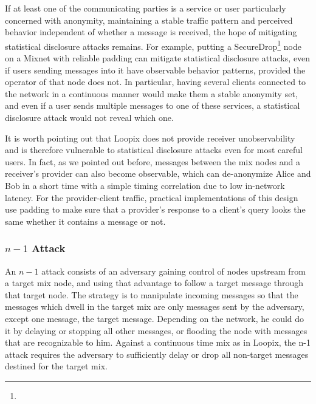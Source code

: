 \documentclass{article}
\begin{document}
If at least one of the communicating parties is a service or user particularly concerned with anonymity, maintaining a stable traffic pattern and perceived behavior independent of whether a message is received, the hope of mitigating statistical disclosure attacks remains. For example, putting a SecureDrop\footnote{} node on a Mixnet with reliable padding can mitigate statistical disclosure attacks, even if users sending messages into it have observable behavior patterns, provided the operator of that node does not. In particular, having several clients connected to the network in a continuous manner would make them a stable anonymity set, and even if a user sends multiple messages to one of these services, a statistical disclosure attack would not reveal which one.

It is worth pointing out that Loopix does not provide receiver unobservability and is therefore vulnerable to statistical disclosure attacks even for most careful users. In fact, as we pointed out before, messages between the mix nodes and a receiver's provider can also become observable, which can de-anonymize Alice and Bob in a short time with a simple timing correlation due to low in-network latency. For the provider-client traffic, practical implementations of this design use padding to make sure that a provider's response to a client's query looks the same whether it contains a message or not. \medskip





\pagebreak
\subsubsection{$n-1$ Attack }

An $n-1$ attack consists of an adversary gaining control of nodes upstream from a target mix node, and using that advantage to follow a target message through that target node. The strategy is to manipulate incoming messages so that the messages which dwell in the target mix are only messages sent by the adversary, except one message, the target message. Depending on the network, he could do it by delaying or stopping all other messages, or flooding the node with messages that are recognizable to him. Against a continuous time mix as in Loopix, the n-1 attack requires the adversary to sufficiently delay or drop all non-target messages destined for the target mix.
\end{document}
